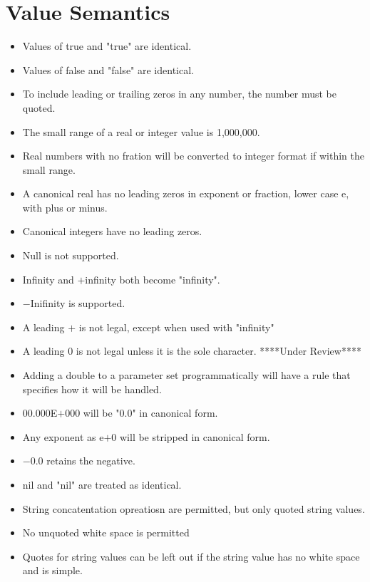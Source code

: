 \documentclass{memarticle}
\begin{document}
{        \section{Value Semantics}
                \begin{itemize}
                        \item Values of true and "true" are identical.
                        \item Values of false and "false" are identical.
                        \item To include leading or trailing zeros in any number,
                                        the number must be quoted.
                        \item The small range of a real or integer value is 1,000,000.
                        \item Real numbers with no fration will be converted to integer format
                                        if within the small range.
                        \item A canonical real has no leading zeros in exponent or fraction, lower case e, with plus or minus.
                        \item Canonical integers have no leading zeros.
                        \item Null is not supported.
                        \item Infinity and $+$infinity both become "infinity".
                        \item $-$Inifinity is supported.
                        \item A leading $+$ is not legal, except when used with "infinity"
                        \item A leading 0 is not legal unless it is the sole character. ****Under Review****
                        \item Adding a double to a parameter set programmatically will have a rule that specifies how it will be handled.
                        \item 00.000E$+$000 will be "0.0" in canonical form.
                        \item Any exponent as e$+$0 will be stripped in canonical form.
                        \item $-$0.0 retains the negative.
                        \item nil and "nil" are treated as identical.
                        \item String concatentation opreatiosn are permitted, but only quoted string values.
                        \item No unquoted white space is permitted
                        \item Quotes for string values can be left out if the string value has no white space and is simple.
                \end{itemize}
}
\end{document}
